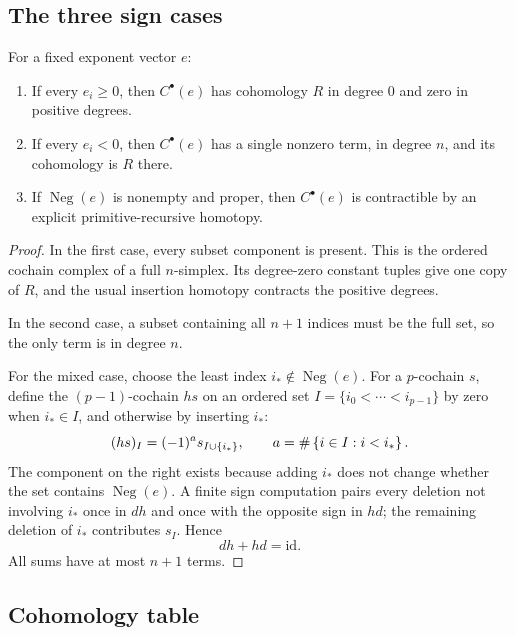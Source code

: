 \subsection{The three sign cases}

\begin{theorem}\label{thm:monomial-summands}
For a fixed exponent vector $e$:
\begin{enumerate}[label=\arabic*.]
\item If every $e_i\geq0$, then $C^\bullet(e)$ has cohomology $R$ in degree $0$ and zero in positive
      degrees.
\item If every $e_i<0$, then $C^\bullet(e)$ has a single nonzero term, in degree $n$, and its
      cohomology is $R$ there.
\item If $\operatorname{Neg}(e)$ is nonempty and proper, then $C^\bullet(e)$ is contractible by an
      explicit primitive-recursive homotopy.
\end{enumerate}
\end{theorem}

\begin{proof}
In the first case, every subset component is present.  This is the ordered cochain complex of a full
$n$-simplex.  Its degree-zero constant tuples give one copy of $R$, and the usual insertion homotopy
contracts the positive degrees.

In the second case, a subset containing all $n+1$ indices must be the full set, so the only term is in
degree $n$.

For the mixed case, choose the least index
$i_*\notin\operatorname{Neg}(e)$.  For a $p$-cochain $s$, define the $(p-1)$-cochain $hs$ on an
ordered set $I=\{i_0<\cdots<i_{p-1}\}$ by zero when $i_*\in I$, and otherwise by inserting $i_*$:
\begin{equation}\label{eq:insertion-homotopy}
 (hs)_I=(-1)^a s_{I\cup\{i_*\}},
 \qquad
 a=\#\left\{i\in I:i<i_*\right\}.
\end{equation}
The component on the right exists because adding $i_*$ does not change whether the set contains
$\operatorname{Neg}(e)$.  A finite sign computation pairs every deletion not involving $i_*$ once in
$dh$ and once with the opposite sign in $hd$; the remaining deletion of $i_*$ contributes $s_I$.
Hence
\[
                              dh+hd=\mathrm{id}.
\]
All sums have at most $n+1$ terms.
\end{proof}

\subsection{Cohomology table}

